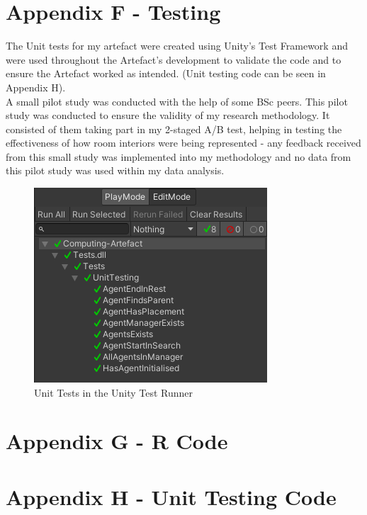 \newpage
\section*{Appendix F - Testing} \label{append:f}
The Unit tests for my artefact were created using Unity's Test Framework and were used throughout the Artefact's development to validate the code and to ensure the Artefact worked as intended. (Unit testing code can be seen in Appendix H).
\\
A small pilot study was conducted with the help of some BSc peers. This pilot study was conducted to ensure the validity of my research methodology. It consisted of them taking part in my 2-staged A/B test, helping in testing the effectiveness of how room interiors were being represented - any feedback received from this small study was implemented into my methodology and no data from this pilot study was used within my data analysis.

\begin{figure}[ht]
    \includegraphics[width=\columnwidth]{./Images/unit-tests.png}
    \centering
    \caption{Unit Tests in the Unity Test Runner}
    \label{unit-tests}
\end{figure}

\newpage
\section*{Appendix G - R Code} \label{append:g}

\newpage
\section*{Appendix H - Unit Testing Code} \label{append:h}
